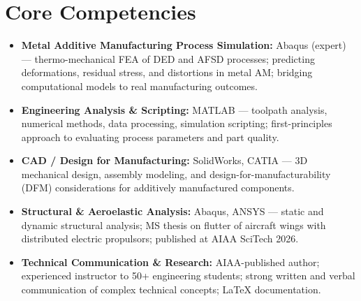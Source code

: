 \documentclass[11pt,a4paper]{moderncv}
\begin{document}
\section{Core Competencies}
\vspace{1pt}
\begin{itemize}

\item \textbf{Metal Additive Manufacturing Process Simulation:} Abaqus (expert) — thermo-mechanical FEA of DED and AFSD processes; predicting deformations, residual stress, and distortions in metal AM; bridging computational models to real manufacturing outcomes.
\vspace{1pt}

\item \textbf{Engineering Analysis \& Scripting:} MATLAB — toolpath analysis, numerical methods, data processing, simulation scripting; first-principles approach to evaluating process parameters and part quality.
\vspace{1pt}

\item \textbf{CAD / Design for Manufacturing:} SolidWorks, CATIA — 3D mechanical design, assembly modeling, and design-for-manufacturability (DFM) considerations for additively manufactured components.
\vspace{1pt}

\item \textbf{Structural \& Aeroelastic Analysis:} Abaqus, ANSYS — static and dynamic structural analysis; MS thesis on flutter of aircraft wings with distributed electric propulsors; published at AIAA SciTech 2026.
\vspace{1pt}

\item \textbf{Technical Communication \& Research:} AIAA-published author; experienced instructor to 50+ engineering students; strong written and verbal communication of complex technical concepts; LaTeX documentation.

\end{itemize}

\end{document}
